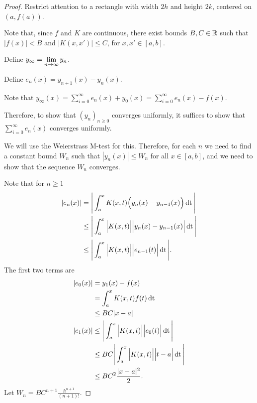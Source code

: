 \documentclass[12pt]{article}
\begin{document}
\begin{proof}
Restrict attention to a rectangle with width $2h$ and height $2k$, centered
on $(a, f(a))$.

Note that, since $f$ and $K$ are continuous, there exist bounds $B, C \in \mathbb{R}$
such that $\Big|f(x)\Big| < B$ and $\Big|K(x, x')\Big| \leq C$, for
$x, x' \in [a,b]$.

Define $y_\infty = \lim\limits_{n \to \infty} y_n$.

Define $e_n(x) = y_{n+1}(x) - y_n(x)$.

Note that $y_\infty(x) = \sum_{i=0}^\infty e_n(x) + y_0(x) = \sum_{i=0}^\infty e_n(x) - f(x)$.

Therefore, to show that $(y_n)_{n\geq 0}$ converges uniformly, it suffices to
show that $\sum_{i=0}^\infty e_n(x)$ converges uniformly.

We will use the Weierstrass M-test for this. Therefore, for each $n$ we need to
find a constant bound $W_n$ such that $|y_n(x)| \leq W_n$ for all
$x \in [a,b]$, and we need to show that the sequence $W_n$ converges.

Note that for $n \geq 1$
\begin{align*}
  |e_n(x)| &   = \Bigg|\int_a^x K(x, t) \Big(y_n(x) - y_{n-1}(x)\Big)\operatorname{\text{dt}}\Bigg|\\
           &\leq \Bigg|\int_a^x \Big|K(x, t)\Big| \Big|y_n(x) - y_{n-1}(x)\Big|\operatorname{\text{dt}}\Bigg|\\
           &\leq \Bigg|\int_a^x \Big|K(x, t)\Big| \Big|e_{n-1}(t)\Big|\operatorname{\text{dt}}\Bigg|.
\end{align*}
The first two terms are
\begin{align*}
  |e_0(x)| &=    y_1(x) - f(x)\\
           &=    \int_a^x K(x, t) f(t)\operatorname{\text{dt}}\\
           &\leq BC|x - a|\\
  |e_1(x)| &\leq \Bigg|\int_a^x \Big|K(x, t)\Big| \Big|e_0(t)\Big|\operatorname{\text{dt}}\Bigg|\\
           &\leq BC\Bigg|\int_a^x \Big|K(x, t)\Big| \Big|t - a\Big| \operatorname{\text{dt}}\Bigg|\\
           &\leq BC^2\frac{|x - a|^2}{2}.
\end{align*}
Let $W_n = BC^{n+1}\frac{h^{n+1}}{(n+1)!}$.


\end{proof}
\end{document}
